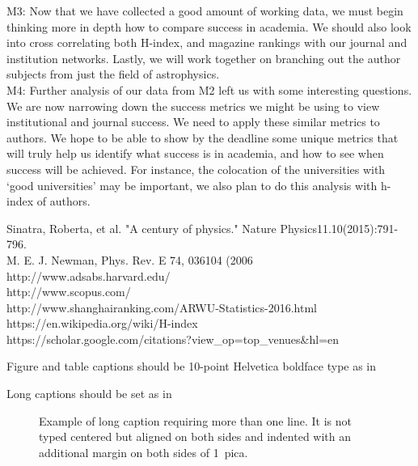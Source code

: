 \documentclass[times, 10pt,twocolumn]{article}
\begin{document}
M3: Now that we have collected a good amount of working data, we must begin thinking more in depth how to compare success in academia. We should also look into cross correlating both H-index, and magazine rankings with our journal and institution networks. Lastly, we will work together on branching out the author subjects from just the field of astrophysics. \\

M4: Further analysis of our data from M2 left us with some interesting questions. We are now narrowing down the success metrics we might be using to view institutional and journal success. We need to apply these similar metrics to authors. We hope to be able to show by the deadline some unique metrics that will truly help us identify what success is in academia, and how to see when success will be achieved. For instance, the colocation of the universities with ‘good universities’ may be important, we also plan to do this analysis with  h-index of authors.

\relax
 [1] Sinatra, Roberta, et al. "A century of physics." Nature Physics11.10(2015):791-796.\\
\relax
 [2] M. E. J. Newman, Phys. Rev. E 74, 036104 (2006\\
\relax
 [3] http://www.adsabs.harvard.edu/\\
\relax
 [4] http://www.scopus.com/\\
\relax
 [5] http://www.shanghairanking.com/ARWU-Statistics-2016.html\\
\relax
 [6] https://en.wikipedia.org/wiki/H-index\\
\relax
 [7] https://scholar.google.com/citations?view\_op=top\_venues\&hl=en\\


Figure and table captions should be 10-point
Helvetica boldface type as in

\noindent Long captions should be set as in
\begin{figure}[h]
   \caption{Example of long caption requiring more than one line. It is
     not typed centered but aligned on both sides and indented with an
     additional margin on both sides of 1~pica.}
\end{figure}
\end{document}
